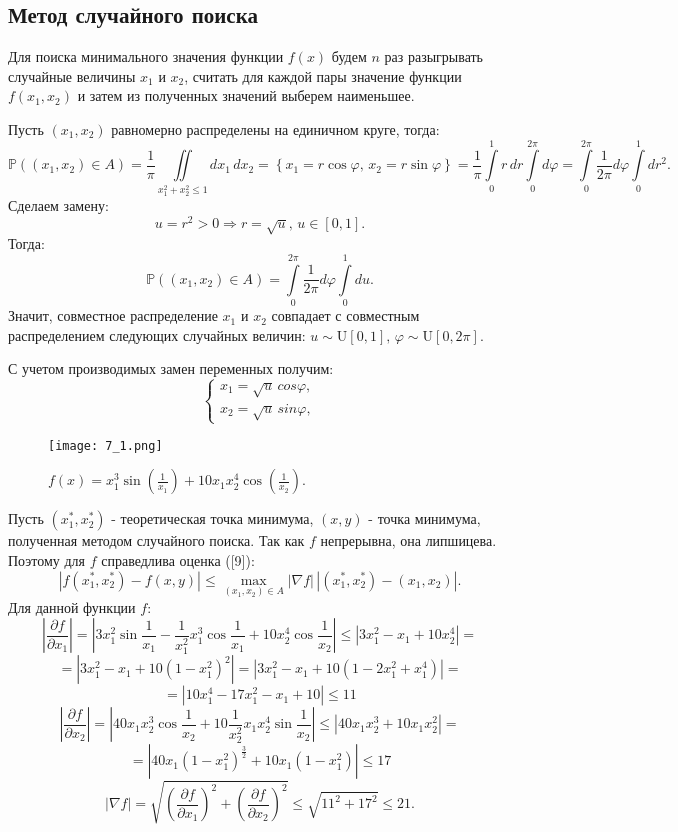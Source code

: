 \documentclass[a4paper, 11pt]{article}
\theoremstyle{def}
\theoremstyle{th}
\theoremstyle{rem}
\begin{document}
\subsection{Метод случайного поиска}
Для поиска минимального значения функции $f(x)$ будем $n$ раз разыгрывать случайные величины $x_1$ и $x_2$, считать для каждой пары значение функции $f(x_1, x_2)$ и затем из полученных значений выберем наименьшее.

Пусть $(x_1, x_2)$ равномерно распределены на единичном круге, тогда:
$$
\mathbb{P}((x_1, x_2) \in A) = \frac{1}{\pi}\iint\limits_{x_1^2 + x_2^2 \leqslant 1} dx_1\,dx_2 = \left\{x_1 = r\cos \varphi, \,x_2 = r\sin\varphi \right\} = \frac{1}{\pi}\int\limits_0^1 r\,dr \int\limits_0^{2\pi}d\varphi = \int\limits_0^{2\pi}\frac{1}{2\pi}d\varphi\int\limits_0^1dr^2.
$$
Сделаем замену:
$$
u = r^2 > 0 \Rightarrow r = \sqrt{u}, \, u \in [0, 1].
$$
Тогда:
$$
\mathbb{P}((x_1, x_2) \in A) = \int\limits_0^{2\pi}\frac{1}{2\pi}d\varphi\int\limits_0^1du.
$$
Значит, совместное распределение $x_1$ и $x_2$ совпадает с совместным распределением следующих случайных величин: $u \sim \mbox{U}[0, 1], \, \varphi \sim \mbox{U}[0, 2\pi].$

С учетом производимых замен переменных получим:
\begin{equation*}
 \begin{cases}
   x_1 = \sqrt{u} \,cos \varphi, 
   \\
   x_2 = \sqrt{u} \,sin\varphi,
 \end{cases}
\end{equation*}
\begin{figure}[H]
        \noindent
        \centering
        {
                \texttt{[image: 7\_1.png]}
        }
        \caption{$f(x) = x_1^3\sin\left(\frac{1}{x_1}\right) +10x_1 x_2^4\cos\left(\frac{1}{x_2}\right).$ }
\end{figure}
Пусть $(x_1^*, x_2^*)$ - теоретическая точка минимума, $(x, y)$ - точка минимума, полученная методом случайного поиска. Так как $f$ непрерывна, она липшицева. Поэтому для $f$ справедлива оценка ([9]):
$$
|f(x_1^*, x_2^*) - f(x, y)| \leqslant \max_{(x_1, x_2) \in A}|\nabla f|\,|(x_1^*, x_2^*) - (x_1, x_2)|.
$$
Для данной функции $f$:
$$
\left|\frac{\partial f}{\partial x_1}\right| = \left|3x_1^2\sin{\frac{1}{x_1}} - \frac{1}{x_1^2} x_1^3 \cos{\frac{1}{x_1}} + 10 x_2^4 \cos{\frac{1}{x_2}}\right| \leqslant |3x_1^2 -  x_1 + 10 x_2^4| =
$$
$$
= |3x_1^2 - x_1 + 10(1-x_1^2)^2| = |3x_1^2 - x_1 + 10(1 - 2x_1^2 + x_1^4)| =$$
$$= |10x_1^4 - 17x_1^2 - x_1 + 10| \leqslant 11
$$
$$
\left|\frac{\partial f}{\partial x_2}\right| = \left|40 x_1 x_2^3 \cos{\frac{1}{x_2}} + 10 \frac{1}{x_2^2} x_1 x_2^4 \sin{\frac{1}{x_2}} \right| \leqslant |40 x_1 x_2^3 + 10 x_1 x_2^2| =
$$
$$
= \left|40 x_1(1-x_1^2)^\frac{3}{2} + 10x_1(1 - x_1^2)\right| \leqslant 17
$$
$$
|\nabla f| = \sqrt{\left(\frac{\partial f}{\partial x_1}\right)^2 + \left(\frac{\partial f}{\partial x_2}\right)^2} \leqslant \sqrt{11^2 + 17^2} \leqslant 21.
$$
\end{document}
